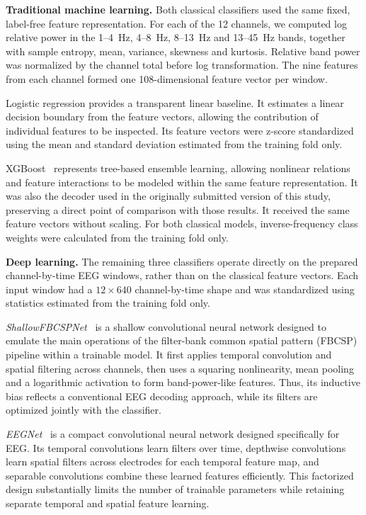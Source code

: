\documentclass[10pt,letterpaper]{article}
\newcommand{\rev}[1]{#1}
\begin{document}
\textbf{Traditional machine learning.}
\rev{Both classical classifiers used the same fixed, label-free feature
representation. For each of the 12 channels, we computed log relative power in
the 1--4~Hz, 4--8~Hz, 8--13~Hz and 13--45~Hz bands, together with sample
entropy, mean, variance, skewness and kurtosis. Relative band power was
normalized by the channel total before log transformation. The nine features
from each channel formed one 108-dimensional feature vector per window.}

\rev{Logistic regression provides a transparent linear baseline. It estimates
a linear decision boundary from the feature vectors, allowing the contribution
of individual features to be inspected. Its feature vectors were z-score
standardized using the mean and standard deviation estimated from the training
fold only.}

\rev{XGBoost~\cite{chen2016xgboost} represents tree-based ensemble learning,
allowing nonlinear relations and feature interactions to be modeled within the
same feature representation. It was also the decoder used in the originally
submitted version of this study, preserving a direct point of comparison with
those results. It received the same feature vectors without scaling. For both
classical models, inverse-frequency class weights were calculated from the
training fold only.}

\textbf{Deep learning.}
\rev{The remaining three classifiers operate directly on the prepared
channel-by-time EEG windows, rather than on the classical feature vectors. Each
input window had a $12 \times 640$ channel-by-time shape and was standardized
using statistics estimated from the training fold only.}

\rev{\textit{ShallowFBCSPNet}~\cite{schirrmeister2017deep} is a shallow
convolutional neural network designed to emulate the main operations of the
filter-bank common spatial pattern (FBCSP) pipeline within a trainable model.
It first applies temporal convolution and spatial filtering across channels,
then uses a squaring nonlinearity, mean pooling and a logarithmic activation to
form band-power-like features. Thus, its inductive bias reflects a conventional
EEG decoding approach, while its filters are optimized jointly with the
classifier.}

\rev{\textit{EEGNet}~\cite{lawhern2018eegnet} is a compact convolutional neural
network designed specifically for EEG. Its temporal convolutions learn filters
over time, depthwise convolutions learn spatial filters across electrodes for
each temporal feature map, and separable convolutions combine these learned
features efficiently. This factorized design substantially limits the number
of trainable parameters while retaining separate temporal and spatial feature
learning.}
\end{document}
